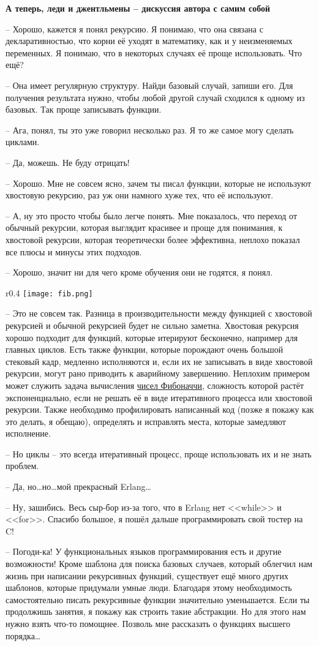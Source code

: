 \textbf{А теперь, леди и джентльмены \--- дискуссия автора с самим собой}

\--- Хорошо, кажется я понял рекурсию.
Я понимаю, что она связана с декларативностью, что корни её уходят в математику, как и у неизменяемых переменных. Я понимаю, что в некоторых случаях её проще использовать. Что ещё?

\--- Она имеет регулярную структуру.
Найди базовый случай, запиши его.
Для получения результата нужно, чтобы любой другой случай сходился к одному из базовых.
Так проще записывать функции.

\--- Ага, понял, ты это уже говорил несколько раз.
Я то же самое могу сделать циклами.

\--- Да, можешь.
Не буду отрицать!

\--- Хорошо.
Мне не совсем ясно, зачем ты писал функции, которые не используют хвостовую рекурсию, раз уж они намного хуже тех, что её используют.

\--- А, ну это просто чтобы было легче понять.
Мне показалось, что переход от обычный рекурсии, которая выглядит красивее и проще для понимания, к хвостовой рекурсии, которая теоретически более эффективна, неплохо показал все плюсы и минусы этих подходов.

\--- Хорошо, значит ни для чего кроме обучения они не годятся, я понял.
\begin{wrapfigure}{r}{0.4\linewidth}
    \texttt{[image: fib.png]}
\end{wrapfigure}

\--- Это не совсем так.
Разница в производительности между функцией с хвостовой рекурсией и обычной рекурсией будет не сильно заметна.
Хвостовая рекурсия хорошо подходит для функций, которые итерируют бесконечно, например для главных циклов.
Есть также функции, которые порождают очень большой стековый кадр, медленно исполняются и, если их не записывать в виде хвостовой рекурсии, могут рано приводить к аварийному завершению.
Неплохим примером может служить задача вычисления \href{http://en.wikipedia.org/wiki/Fibonacci\_number}{чисел Фибоначчи}, сложность которой растёт экспоненциально, если не решать её в виде итеративного процесса или хвостовой рекурсии.
Также необходимо профилировать написанный код (позже я покажу как это делать, я обещаю), определять и исправлять места, которые замедляют исполнение.

\--- Но циклы \--- это всегда итеративный процесс, проще использовать их и не знать проблем.

\--- Да, но\ldots но\ldots мой прекрасный Erlang\ldots

\--- Ну, зашибись.
Весь сыр\--бор из\--за того, что в Erlang нет <<while>> и <<for>>.
Спасибо большое, я пошёл дальше программировать свой тостер на C!

\--- Погоди\--ка!
У функциональных языков программирования есть и другие возможности!
Кроме шаблона для поиска базовых случаев, который облегчил нам жизнь при написании рекурсивных функций, существует ещё много других шаблонов, которые придумали умные люди.
Благодаря этому необходимость самостоятельно писать рекурсивные функции значительно уменьшается.
Если ты продолжишь занятия, я покажу как строить такие абстракции.
Но для этого нам нужно взять что\--то помощнее.
Позволь мне рассказать о функциях высшего порядка\ldots
